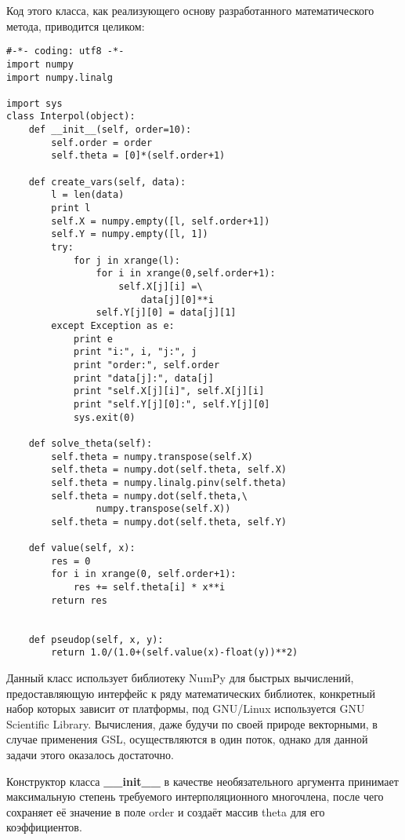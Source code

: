 Код этого класса, как реализующего основу разработанного математического метода, приводится целиком:

\lstset{language=Python}
\begin{lstlisting}
#-*- coding: utf8 -*-
import numpy
import numpy.linalg

import sys
class Interpol(object):
	def __init__(self, order=10):
		self.order = order
		self.theta = [0]*(self.order+1)

	def create_vars(self, data):
		l = len(data)
		print l
		self.X = numpy.empty([l, self.order+1])
		self.Y = numpy.empty([l, 1])
		try:
			for j in xrange(l):
				for i in xrange(0,self.order+1):
					self.X[j][i] =\
						data[j][0]**i
				self.Y[j][0] = data[j][1]
		except Exception as e:
			print e
			print "i:", i, "j:", j
			print "order:", self.order
			print "data[j]:", data[j]
			print "self.X[j][i]", self.X[j][i]
			print "self.Y[j][0]:", self.Y[j][0]
			sys.exit(0)

	def solve_theta(self):
		self.theta = numpy.transpose(self.X)
		self.theta = numpy.dot(self.theta, self.X)
		self.theta = numpy.linalg.pinv(self.theta)
		self.theta = numpy.dot(self.theta,\
				numpy.transpose(self.X))
		self.theta = numpy.dot(self.theta, self.Y)

	def value(self, x):
		res = 0
		for i in xrange(0, self.order+1):
			res += self.theta[i] * x**i
		return res


	def pseudop(self, x, y):
		return 1.0/(1.0+(self.value(x)-float(y))**2)
\end{lstlisting}

Данный класс использует библиотеку NumPy для быстрых вычислений, предоставляющую интерфейс к ряду математических библиотек, конкретный набор которых зависит от платформы, под GNU/Linux используется GNU Scientific Library\cite{gsl}. Вычисления, даже будучи по своей природе векторными, в случае применения GSL, осуществляются в один поток, однако для данной задачи этого оказалось достаточно.

Конструктор класса {\bf{}\_\_init\_\_} в качестве необязательного аргумента принимает максимальную степень требуемого интерполяционного многочлена, после чего сохраняет её значение в поле order и создаёт массив theta для его коэффициентов.

